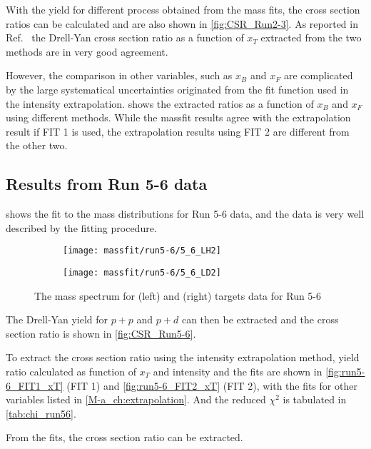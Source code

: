 \documentclass[../main.tex]{subfiles}
\begin{document}
With the yield for different process obtained from the mass fits, the cross section ratios can be calculated
and are also shown in \cref{fig:CSR_Run2-3}.
As reported in Ref.~\cite{dove2023} the Drell-Yan cross section ratio as a function of $x_T$ extracted from
the two methods are in very good agreement.

However, the comparison in other variables, such as $x_B$ and $x_F$ are complicated by the large
systematical uncertainties originated from the fit function used in the intensity extrapolation.
 shows the extracted ratios as a function of $x_B$ and $x_F$ using different methods.
While the massfit results agree with the extrapolation result if FIT 1 is used, the
extrapolation results using FIT 2 are different from the other two.

\FloatBarrier

\subsection{Results from Run 5-6 data}
 shows the fit to the mass distributions for Run 5-6 data,
and the data is very well described by the fitting procedure.
\begin{figure}[h!]
	\begin{subfigure}{0.45\linewidth}
		\texttt{[image: massfit/run5-6/5\_6\_LH2]}
	\end{subfigure}
	\begin{subfigure}{0.45\linewidth}
		\texttt{[image: massfit/run5-6/5\_6\_LD2]}
	\end{subfigure}
	\caption{The mass spectrum for (left) and (right) targets data for Run 5-6}
	\label{fig:massfit_integrated_run56}
\end{figure}
The Drell-Yan yield for $p+p$ and $p+d$ can then be extracted and the cross section ratio
is shown in \cref{fig:CSR_Run5-6}.

To extract the cross section ratio using the intensity extrapolation method, yield ratio
calculated as function of $x_T$ and intensity and the fits are shown in \cref{fig:run5-6_FIT1_xT}
(FIT 1) and \cref{fig:run5-6_FIT2_xT} (FIT 2), with the fits for other variables listed in
\cref{M-a_ch:extrapolation}. And the reduced $\chi^2$ is tabulated in \cref{tab:chi_run56}.


From the fits, the cross section ratio can be extracted.
\end{document}
